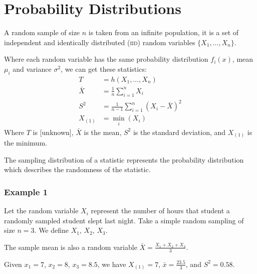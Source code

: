             \section{Probability Distributions} %
            \label{sec:probability_distributions}

                A random sample of size $n$ is taken from an infinite population, it is a set of independent and identically distributed (\textsc{iid}) random variables $\{ X_1, \ldots, X_n \}$.

                Where each random variable has the same probability distribution $f_i(x)$, mean $\mu_i$ and variance $\sigma^2$, we can get these statistics:
                \begin{align*}
                    T &= h(X_1, \ldots, X_n) \\
                    \bar{X} &= \frac{1}{n} \sum_{i=1}^n X_i \\
                    S^2 &= \frac{1}{n-1} \sum_{i=1}^n (X_i - \bar{X})^2 \\
                    X_{(1)} &= \min_i (X_i)
                \end{align*}
                Where $T$ is [unknown], %
                $\bar{X}$ is the mean,
                $S^2$ is the standard deviation,
                and $X_{(1)}$ is the minimum. %

                The sampling distribution of a statistic represents the probability distribution which describes the randomness of the statistic.

                \subsubsection{Example 1} %
                \label{ssub:example_1}
                    Let the random variable $X_i$ represent the number of hours that student a randomly sampled student slept last night.
                    Take a simple random sampling of size $n = 3$.
                    We define $X_1$, $X_2$, $X_3$.

                    The sample mean is also a random variable $\bar{X} = \frac{X_1 + X_2 + X_3}{3}$.

                    Given $x_1 = 7$, $x_2 = 8$, $x_3 = 8.5$, we have $X_{(1)} = 7$, $\bar{x} = \frac{23.5}{3}$, and $S^2 = 0.58$.

